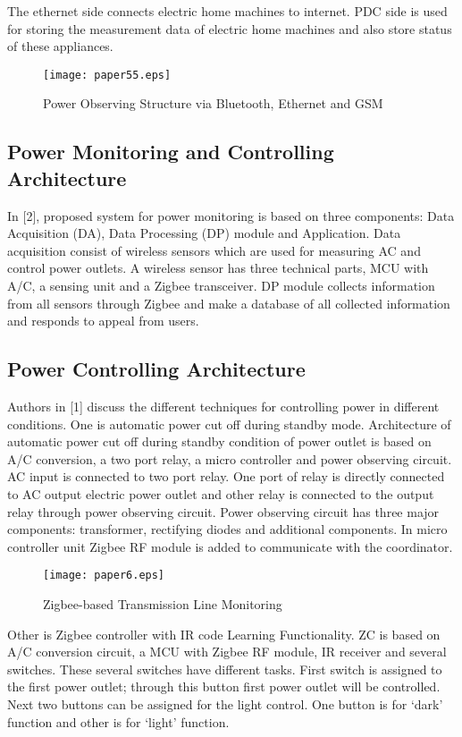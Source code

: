\documentclass[10pt, conference, compsocconf]{IEEEtran}
\begin{document}
The ethernet side connects electric home machines to internet. PDC side is used for storing the measurement data of electric home machines and also store status of these appliances.

\begin{figure*}[t]
\centering
  \texttt{[image: paper55.eps]}
  \caption{Power Observing Structure via Bluetooth, Ethernet and GSM}
\end{figure*}


\subsection{Power Monitoring and Controlling Architecture}
In [2], proposed system for power monitoring is based on three components: Data Acquisition (DA), Data Processing (DP) module and Application. Data acquisition consist of wireless sensors which are used for measuring AC and control power outlets. A wireless sensor has three technical parts, MCU with A/C, a sensing unit and a Zigbee transceiver. DP module collects information from all sensors through Zigbee and make a database of all collected information and responds to appeal from users.

\subsection{Power Controlling Architecture}
Authors in [1] discuss the different techniques for controlling power in different conditions. One is automatic power cut off during standby mode. Architecture of automatic power cut off during standby condition of power outlet is based on A/C conversion, a two port relay, a micro controller and power observing circuit. AC input is connected to two port relay. One port of relay is directly connected to AC output electric power outlet and other relay is connected to the output relay through power observing circuit. Power observing circuit has three major components: transformer, rectifying diodes and additional components. In micro controller unit Zigbee RF module is added to communicate with the coordinator.

 \begin{figure*}[t]
\centering
  \texttt{[image: paper6.eps]}
  \caption{Zigbee-based Transmission Line Monitoring}
\end{figure*}

Other is Zigbee controller with IR code Learning Functionality. ZC is based on A/C conversion circuit, a MCU with Zigbee RF module, IR receiver and several switches. These several switches have different tasks. First switch is assigned to the first power outlet; through this button first power outlet will be controlled. Next two buttons can be assigned for the light control. One button is for `dark' function and other is for `light' function.
\end{document}
